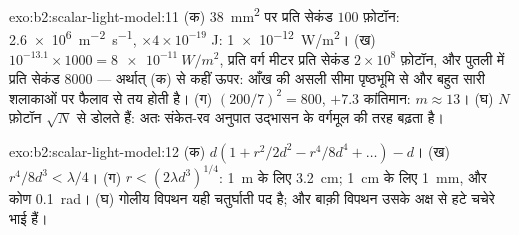 \begin{solution}{exo:b2:scalar-light-model:11}
(क) \qty{38}{mm^2} पर प्रति सेकंड $100$ फ़ोटॉन: \qty{2.6e6}{m^{-2}.s^{-1}}, $\times4 \times
10^{-19}$ J: \qty{1e-12}{W/m^2}। (ख) $10^{-13.1} \times 1000 = \qty{8e-11}{W/m^2}$, प्रति वर्ग मीटर
प्रति सेकंड $2 \times 10^8$ फ़ोटॉन, और पुतली में प्रति सेकंड $8000$
--- अर्थात् (क) से कहीं ऊपर: आँख की असली सीमा पृष्ठभूमि से और
बहुत सारी शलाकाओं पर फैलाव से तय होती है। (ग) $(200/7)^2 = 800$, $+7.3$ कांतिमान: $m \approx
13$। (घ) $N$ फ़ोटॉन $\sqrt N$ से डोलते हैं: अतः संकेत-रव अनुपात
उद्भासन के वर्गमूल की तरह बढ़ता है।
\end{solution}

\begin{solution}{exo:b2:scalar-light-model:12}
(क) $d(1 + r^2/2d^2 - r^4/8d^4 + \dots) - d$। (ख) $r^4/8d^3 < \lambda/4$। (ग) $r <
(2\lambda d^3)^{1/4}$: \qty{1}{m} के लिए \qty{3.2}{cm}; \qty{1}{cm} के लिए \qty{1}{mm}, और कोण
\qty{0.1}{rad}। (घ) गोलीय विपथन यही चतुर्घाती पद है; और बाक़ी
विपथन उसके अक्ष से हटे चचेरे भाई हैं।
\end{solution}

